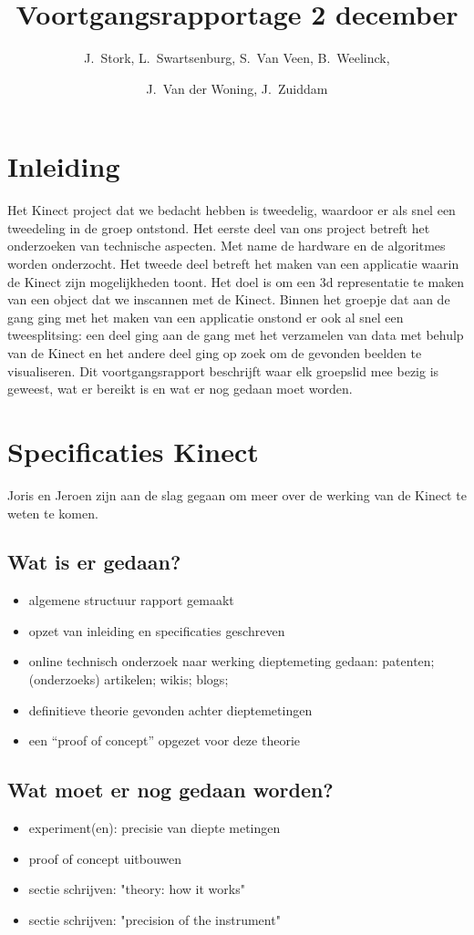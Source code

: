 \documentclass[10pt,a4paper]{article}
\author{
  J.\ Stork, L.\ Swartsenburg,  S.\ Van Veen, B.\ Weelinck,\and J.\ Van der Woning, J.\ Zuiddam 
} %
\title{Voortgangsrapportage 2 december}
\begin{document}
\maketitle
\tableofcontents
\section{Inleiding}
Het Kinect project dat we bedacht hebben is tweedelig, waardoor er als snel een tweedeling in de groep ontstond. Het eerste deel van ons project betreft het onderzoeken van technische aspecten. Met name de hardware en de algoritmes worden onderzocht. Het tweede deel betreft het maken van een applicatie waarin de Kinect zijn mogelijkheden toont. Het doel is om een 3d representatie te maken van een object dat we inscannen met de Kinect. Binnen het groepje dat aan de gang ging met het maken van een applicatie onstond er ook al snel een tweesplitsing: een deel ging aan de gang met het verzamelen van data met behulp van de Kinect en het andere deel ging op zoek om de gevonden beelden te visualiseren. Dit voortgangsrapport beschrijft waar elk groepslid mee bezig is geweest, wat er bereikt is en wat er nog gedaan moet worden. 

\section{Specificaties Kinect}
Joris en Jeroen zijn aan de slag gegaan om meer over de werking van de Kinect te weten te komen. 

\subsection{Wat is er gedaan?}
\begin{itemize}
\item algemene structuur rapport gemaakt
\item opzet van inleiding en specificaties geschreven
\item online technisch onderzoek naar werking dieptemeting gedaan: patenten; (onderzoeks) artikelen; wikis; blogs;
\item definitieve theorie gevonden achter dieptemetingen
\item een ``proof of concept'' opgezet voor deze theorie
\end{itemize}
\subsection{Wat moet er nog gedaan worden?}
\begin{itemize}
\item experiment(en): precisie van diepte metingen
\item proof of concept uitbouwen
\item sectie schrijven: "theory: how it works"
\item sectie schrijven: "precision of the instrument"
\end{itemize}
\end{document}

